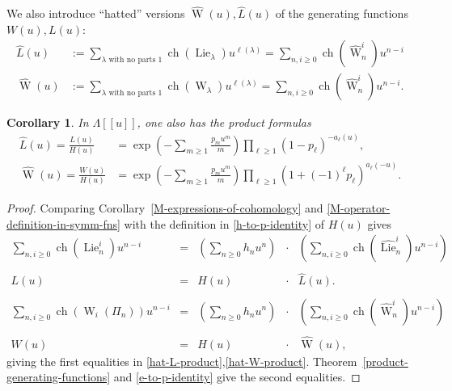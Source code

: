 \documentclass[12pt]{amsart}
\theoremstyle{plain}
\newtheorem{cor}[thm]{Corollary}
\theoremstyle{definition}
\begin{document}
We also introduce ``hatted'' versions $\widehat{{\operatorname{W}}}(u), \widehat{L}(u)$
of the generating functions $W(u), L(u)$:
\begin{align}
\widehat{L}(u)&:=\sum_{\lambda \text{ with no parts }1} 
              {{\operatorname{ch}}}({{\operatorname{Lie}}}_\lambda) u^{\ell(\lambda)}
=\sum_{n,i \geq 0} {{\operatorname{ch}}}(\widehat{{\operatorname{W}}}^i_n) u^{n-i} 
\\
\widehat{{\operatorname{W}}}(u)&:=\sum_{\lambda \text{ with no parts }1} 
              {{\operatorname{ch}}}({{\operatorname{W}}}_\lambda) u^{\ell(\lambda)}
=\sum_{n,i \geq 0} {{\operatorname{ch}}}(\widehat{{\operatorname{W}}}^i_n) u^{n-i}.
\end{align}

\begin{cor}
\label{hat-product-formulas}
In $\Lambda[[u]]$, one also has the product formulas 
\begin{align}
\widehat{L}(u)
=\frac{L(u)}{H(u)} 
&=
\exp\left( - \sum_{m \geq 1} \frac{p_m u^m}{m} \right)
\prod_{\ell \geq 1} 
   \left( 
     1-p_\ell 
   \right)^{-a_\ell(u)},
\label{hat-L-product}
\\
\widehat{{\operatorname{W}}}(u)
=\frac{W(u)}{H(u)} 
&=
\exp\left( - \sum_{m \geq 1} \frac{p_m u^m}{m} \right)
\prod_{\ell \geq 1} 
   \left( 
     1 + (-1)^\ell p_\ell 
   \right)^{a_\ell(-u)}.
\label{hat-W-product}
\end{align}
\end{cor}
\begin{proof}
Comparing Corollary~\ref{M-expressions-of-cohomology} and 
\eqref{M-operator-definition-in-symm-fns}
with the definition in \eqref{h-to-p-identity} of $H(u)$ gives
$$
\begin{array}{rcrcl}
\displaystyle
\sum_{n,i \geq 0} {{\operatorname{ch}}}({{\operatorname{Lie}}}^i_n) u^{n-i}
 &=& \left( \displaystyle
      \sum_{n \geq 0} h_n u^n 
     \right) & \cdot &
     \left(\displaystyle
       \sum_{n,i \geq 0} {{\operatorname{ch}}}(\widehat{{\operatorname{Lie}}}^i_n) u^{n-i}
     \right)\\
 & & & \\
L(u) &=& H(u)& \cdot & \widehat{L}(u).\\
 & & & \\
\displaystyle
\sum_{n,i \geq 0} {{\operatorname{ch}}}({{\operatorname{W}}}_i(\Pi_n)) u^{n-i}
 &=& \left( \displaystyle
      \sum_{n \geq 0} h_n u^n 
     \right) & \cdot &
     \left(\displaystyle
       \sum_{n,i \geq 0} {{\operatorname{ch}}}(\widehat{{\operatorname{W}}}^i_n) u^{n-i}
     \right)\\
 & & & \\
W(u) &=& H(u)& \cdot & \widehat{{\operatorname{W}}}(u),
\end{array}
$$
giving the first equalities in \eqref{hat-L-product},\eqref{hat-W-product}.
Theorem~\ref{product-generating-functions}
and \eqref{e-to-p-identity} give the second equalities.
\end{proof}
\end{document}
